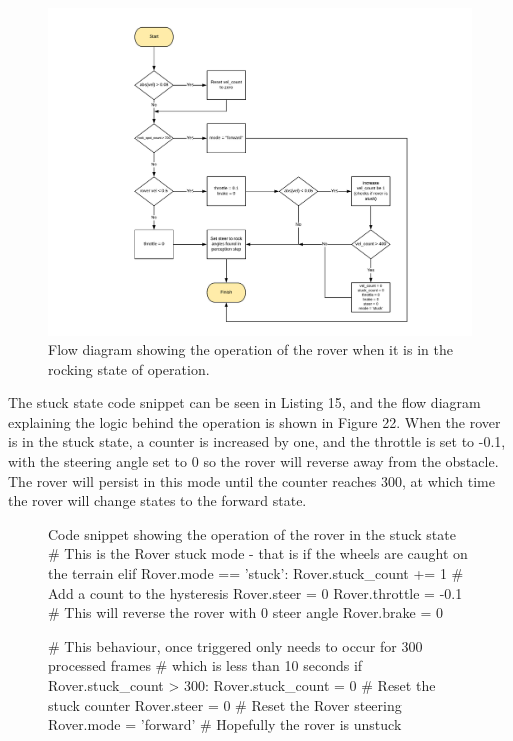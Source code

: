 \documentclass[a4paper]{article}
\begin{document}
\begin{figure}[h]
\hspace{-2.5cm}
\includegraphics[scale=0.7]{rocking_flow}
\caption{Flow diagram showing the operation of the rover when it is in the rocking state of operation.}
\end{figure}

The stuck state code snippet can be seen in Listing 15, and the flow diagram explaining the logic behind the operation is shown in Figure 22. When the rover is in the stuck state, a counter is increased by one, and the throttle is set to -0.1, with the steering angle set to 0 so the rover will reverse away from the obstacle. The rover will persist in this mode until the counter reaches 300, at which time the rover will change states to the forward state.\\

\begin{figure}[h]\scriptsize
\begin{sexylisting}{Code snippet showing the operation of the rover in the stuck state}
# This is the Rover stuck mode - that is if the wheels are caught on the terrain        
        elif Rover.mode == 'stuck':
            Rover.stuck_count += 1 # Add a count to the hysteresis
            Rover.steer = 0
            Rover.throttle = -0.1 # This will reverse the rover with 0 steer angle
            Rover.brake = 0
            
            # This behaviour, once triggered only needs to occur for 300 processed frames
            # which is less than 10 seconds
            if Rover.stuck_count > 300:
                Rover.stuck_count = 0 # Reset the stuck counter
                Rover.steer = 0 # Reset the Rover steering
                Rover.mode = 'forward' # Hopefully the rover is unstuck
\end{sexylisting}
\end{figure}
\end{document}
